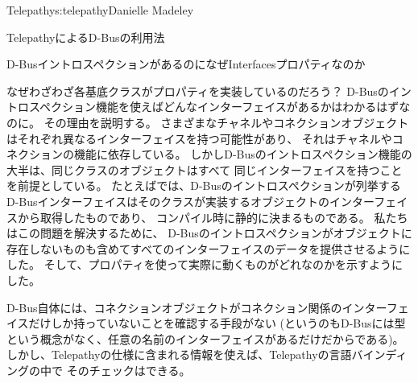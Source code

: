 \begin{aosachapter}{Telepathy}{s:telepathy}{Danielle Madeley}
\begin{aosasect1}{TelepathyによるD-Busの利用法}
\begin{aosabox}{D-BusイントロスペクションがあるのになぜInterfacesプロパティなのか}

なぜわざわざ各基底クラスがプロパティを実装しているのだろう？
D-Busのイントロスペクション機能を使えばどんなインターフェイスがあるかはわかるはずなのに。
その理由を説明する。
さまざまなチャネルやコネクションオブジェクトはそれぞれ異なるインターフェイスを持つ可能性があり、
それはチャネルやコネクションの機能に依存している。
しかしD-Busのイントロスペクション機能の大半は、同じクラスのオブジェクトはすべて
同じインターフェイスを持つことを前提としている。
たとえばでは、D-Busのイントロスペクションが列挙する
D-Busインターフェイスはそのクラスが実装するオブジェクトのインターフェイスから取得したものであり、
コンパイル時に静的に決まるものである。
私たちはこの問題を解決するために、
D-Busのイントロスペクションがオブジェクトに存在しないものも含めてすべてのインターフェイスのデータを提供させるようにした。
そして、プロパティを使って実際に動くものがどれなのかを示すようにした。

\end{aosabox}

D-Bus自体には、コネクションオブジェクトがコネクション関係のインターフェイスだけしか持っていないことを確認する手段がない
(というのもD-Busには型という概念がなく、任意の名前のインターフェイスがあるだけだからである)。
しかし、Telepathyの仕様に含まれる情報を使えば、Telepathyの言語バインディングの中で
そのチェックはできる。


\end{aosasect1}
\end{aosachapter}
